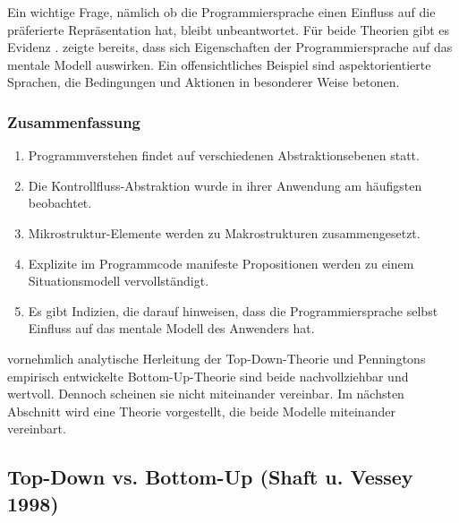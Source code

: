 Ein wichtige Frage, nämlich ob die Programmiersprache einen Einfluss auf die präferierte Repräsentation hat, bleibt unbeantwortet. Für beide Theorien gibt es Evidenz \citep{spoehr1984comprehension,hayes1975psychological}. \cite{doi:10.1080/00140138008924799} zeigte bereits, dass sich Eigenschaften der Programmiersprache auf das mentale Modell auswirken. Ein offensichtliches Beispiel sind aspektorientierte Sprachen, die Bedingungen und Aktionen in besonderer Weise betonen.


\subsubsection{Zusammenfassung}

\begin{enumerate}
  \item Programmverstehen findet auf verschiedenen Abstraktionsebenen statt.
  \item Die Kontrollfluss-Abstraktion wurde in ihrer Anwendung am häufigsten beobachtet.
  \item Mikrostruktur-Elemente werden zu Makrostrukturen zusammengesetzt.
  \item Explizite im Programmcode manifeste Propositionen werden zu einem Situationsmodell vervollständigt.
  \item Es gibt Indizien, die darauf hinweisen, dass die Programmiersprache selbst Einfluss auf das mentale Modell des Anwenders hat.
\end{enumerate}

\cite{Brooks:1983fj} vornehmlich analytische Herleitung der Top-Down-Theorie und Penningtons empirisch entwickelte Bottom-Up-Theorie sind beide nachvollziehbar und wertvoll. Dennoch scheinen sie nicht miteinander vereinbar. Im nächsten Abschnitt wird eine Theorie vorgestellt, die beide Modelle miteinander vereinbart.



\subsection{Top-Down vs. Bottom-Up (Shaft u. Vessey 1998)}
\label{sec:shaft}

